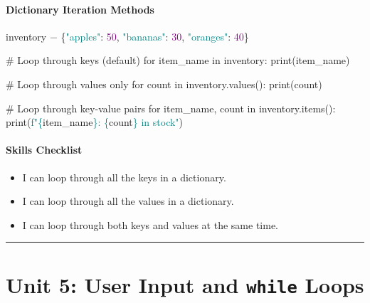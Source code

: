 \documentclass[
  justified,
  openright,
]{tufte-book}
\let\subsubsection\paragraph
\let\paragraph\paragraph
\newcommand{\BuiltInTok}[1]{#1}
\newcommand{\CommentTok}[1]{\textcolor{MidGray}{#1}}
\newcommand{\ControlFlowTok}[1]{\textcolor{BrandBlue}{#1}}
\newcommand{\DecValTok}[1]{\textcolor{Purple}{#1}}
\newcommand{\KeywordTok}[1]{\textcolor{BrandBlue}{#1}}
\newcommand{\NormalTok}[1]{#1}
\newcommand{\OperatorTok}[1]{\textcolor{DarkGray}{#1}}
\newcommand{\SpecialCharTok}[1]{\textcolor{Teal}{#1}}
\newcommand{\SpecialStringTok}[1]{\textcolor{Teal}{#1}}
\newcommand{\StringTok}[1]{\textcolor{Teal}{#1}}
\newenvironment{Shaded}{%
  \begin{snugshade}
}{%
  \end{snugshade}
}
\let\subsubsection\paragraph
\let\paragraph\paragraph
\providecommand{\tightlist}{%
  \setlength{\itemsep}{0pt}\setlength{\parskip}{0pt}}
\begin{document}
\subsubsection{Dictionary Iteration
Methods}\label{dictionary-iteration-methods}

\begin{Shaded}
\begin{Highlighting}[]
\NormalTok{inventory }\OperatorTok{=}\NormalTok{ \{}\StringTok{"apples"}\NormalTok{: }\DecValTok{50}\NormalTok{, }\StringTok{"bananas"}\NormalTok{: }\DecValTok{30}\NormalTok{, }\StringTok{"oranges"}\NormalTok{: }\DecValTok{40}\NormalTok{\}}

\CommentTok{\# Loop through keys (default)}
\ControlFlowTok{for}\NormalTok{ item\_name }\KeywordTok{in}\NormalTok{ inventory:}
    \BuiltInTok{print}\NormalTok{(item\_name)}

\CommentTok{\# Loop through values only}
\ControlFlowTok{for}\NormalTok{ count }\KeywordTok{in}\NormalTok{ inventory.values():}
    \BuiltInTok{print}\NormalTok{(count)}

\CommentTok{\# Loop through key{-}value pairs}
\ControlFlowTok{for}\NormalTok{ item\_name, count }\KeywordTok{in}\NormalTok{ inventory.items():}
    \BuiltInTok{print}\NormalTok{(}\SpecialStringTok{f"}\SpecialCharTok{\{}\NormalTok{item\_name}\SpecialCharTok{\}}\SpecialStringTok{: }\SpecialCharTok{\{}\NormalTok{count}\SpecialCharTok{\}}\SpecialStringTok{ in stock"}\NormalTok{)}
\end{Highlighting}
\end{Shaded}

\subsubsection{Skills Checklist}\label{skills-checklist-21}

\begin{itemize}
\tightlist
\item[$\square$]
  I can loop through all the keys in a dictionary.
\item[$\square$]
  I can loop through all the values in a dictionary.
\item[$\square$]
  I can loop through both keys and values at the same time.
\end{itemize}

\begin{center}\rule{0.5\linewidth}{0.5pt}\end{center}

\section{\texorpdfstring{Unit 5: User Input and \texttt{while}
Loops}{Unit 5: User Input and while Loops}}\label{unit-5-user-input-and-while-loops-1}
\end{document}
